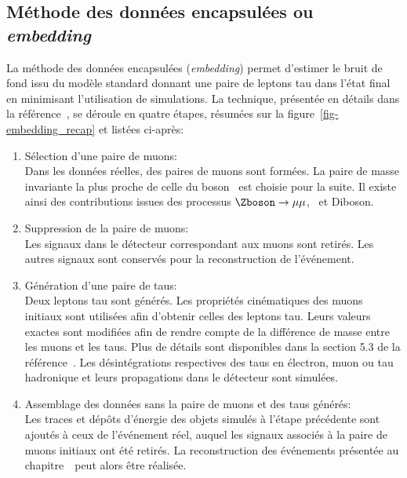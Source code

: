 \subsection{Méthode des données encapsulées ou \emph{embedding}}\label{chapter-HTT_analysis-section-bg_estimation-embedding}
La méthode des données encapsulées (\emph{embedding}) permet d'estimer le bruit de fond issu du modèle standard donnant une paire de leptons tau dans l'état final en minimisant l'utilisation de simulations.
La technique, présentée en détails dans la référence~\cite{embedding}, se déroule en quatre étapes, résumées sur la figure~\ref{fig-embedding_recap} et listées ci-après:
\begin{enumerate}
\item Sélection d'une paire de muons:\\
Dans les données réelles, des paires de muons sont formées.
La paire de masse invariante la plus proche de celle du boson \Zboson\ est choisie pour la suite.
Il existe ainsi des contributions issues des processus $\Zboson\to\mu\mu$, \ttbar\ et Diboson.
\item Suppression de la paire de muons:\\
Les signaux dans le détecteur correspondant aux muons sont retirés.
Les autres signaux sont conservés pour la reconstruction de l'événement.
\item Génération d'une paire de taus:\\
Deux leptons tau sont générés.
Les propriétés cinématiques des muons initiaux sont utilisées afin d'obtenir celles des leptons tau.
Leurs valeurs exactes sont modifiées afin de rendre compte de la différence de masse entre les muons et les taus.
Plus de détails sont disponibles dans la section 5.3 de la référence~\cite{embedding}.
Les désintégrations respectives des taus en électron, muon ou tau hadronique et leurs propagations dans le détecteur sont simulées.
\item Assemblage des données sans la paire de muons et des taus générés:\\
Les traces et dépôts d'énergie des objets simulés à l'étape précédente sont ajoutés à ceux de l'événement réel, auquel les signaux associés à la paire de muons initiaux ont été retirés.
La reconstruction des événements présentée au chapitre~\ peut alors être réalisée.
\end{enumerate}
